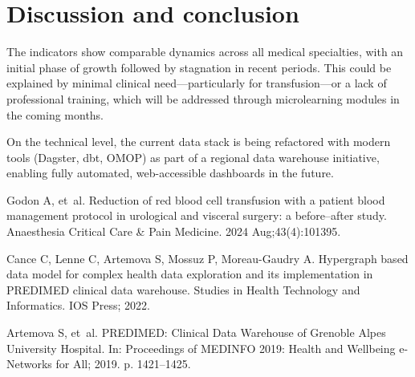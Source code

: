 \documentclass{IOS-Book-Article}
\begin{document}
\section{Discussion and conclusion}

The indicators show comparable dynamics across all medical specialties, with an initial phase of growth followed by stagnation in recent periods. This could be explained by minimal clinical need—particularly for transfusion—or a lack of professional training, which will be addressed through microlearning modules in the coming months.

On the technical level, the current data stack is being refactored with modern tools (Dagster, dbt, OMOP) as part of a regional data warehouse initiative, enabling fully automated, web-accessible dashboards in the future.

\begin{thebibliography}{99}

Godon A, et~al. Reduction of red blood cell transfusion with a patient blood management protocol in urological and visceral surgery: a before–after study. Anaesthesia Critical Care \& Pain Medicine. 2024 Aug;43(4):101395.

Cance C, Lenne C, Artemova S, Mossuz P, Moreau-Gaudry A. Hypergraph based data model for complex health data exploration and its implementation in PREDIMED clinical data warehouse. Studies in Health Technology and Informatics. IOS Press; 2022.

Artemova S, et~al. PREDIMED: Clinical Data Warehouse of Grenoble Alpes University Hospital. In: Proceedings of MEDINFO 2019: Health and Wellbeing e-Networks for All; 2019. p. 1421--1425.



\end{thebibliography}
\end{document}
